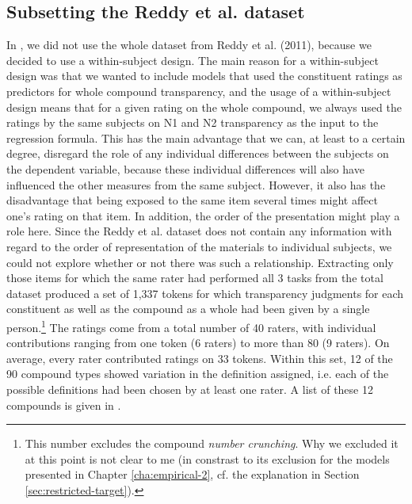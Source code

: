 \subsection{Subsetting the Reddy et al. dataset}
\label{sec:bell-and-schaefer-2013_subset}
In \citet{BellandSchaefer:2013}, we did not use the whole dataset from Reddy
et al. (2011), because we decided to use a within-sub\-ject design. The
main reason for a within-subject design was that we wanted to include models that
used the constituent ratings as predictors for whole compound
transparency, and the usage of a within-subject design means that for
a given rating on the whole compound, we always used the ratings
by the same subjects on N1 and N2 transparency as  the input to the
regression formula. This has the main advantage that we can, at least to a certain degree, disregard
the role of any individual differences between the subjects on the
dependent variable, because these individual differences will also
have influenced the other measures from the same subject. However, it
also has the disadvantage that being exposed to the same item several
times might affect one's rating on that item. In addition, the order
of the presentation might play a role here. Since the Reddy et
al. dataset does not contain any information with regard to the order
of representation of the materials to individual subjects, we could
not explore whether or not there was such a relationship. 
Extracting only those items for which the same rater had performed all
3 tasks from the total dataset produced a set of 1,337 tokens for
which transparency judgments for each constituent as well as the
compound as a whole had been given by a single person.\footnote{This
  number excludes the compound \emph{number crunching}. Why we
  excluded it at this point is not clear to me (in constrast to its
  exclusion for the models presented in Chapter \ref{cha:empirical-2},
  cf. the explanation in Section \ref{sec:restricted-target}).}  The
ratings come from a total number of 40 raters, with individual
contributions ranging from one token (6 raters) to more than 80 (9
raters). On average, every rater contributed ratings on 33 tokens.
Within this
set, 12 of the 90 compound types showed variation in the definition
assigned, i.e. each of the possible definitions had been chosen by at
least one rater. A list of these 12 compounds is given in \Next.

